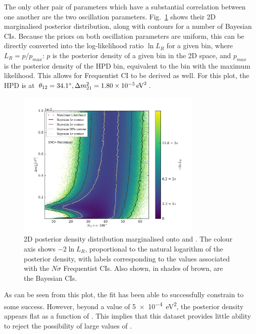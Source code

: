 The only other pair of parameters which have a substantial correlation between one another are the two oscillation parameters. Fig.~\ref{fig:2d_osc_param_posterior} shows their 2D marginalised posterior distribution, along with contours for a number of Bayesian CIs. Because the priors on both oscillation parameters are uniform, this can be directly converted into the log-likelihood ratio $\ln{L_{R}}$ for a given bin, where $L_{R} = p/p_{max}$: $p$ is the posterior density of a given bin in the 2D space, and $p_{max}$ is the posterior density of the HPD bin, equivalent to the bin with the maximum likelihood. This allows for Frequentist CI to be derived as well. For this plot, the HPD is at $\tonetwo{} = \ang{34.1}, \dmsq{} = \SI{1.80e-5}{\eV\squared}$.

\begin{figure}
    \centering
    \includegraphics[width=0.8\textwidth]{6_SolarAnalysis/images/steve_style_contours.png}
    \caption[2D posterior density distribution marginalised onto \dmsq{} and \tonetwo{}]
    {2D posterior density distribution marginalised onto \dmsq{} and \tonetwo{}. The colour axis shows $-2\ln{L_{R}}$, proportional to the natural logarithm of the posterior density, with labels corresponding to the values associated with the $N\sigma$ Frequentist CIs. Also shown, in shades of brown, are the Bayesian CIs.}
    \label{fig:2d_osc_param_posterior}
\end{figure}

As can be seen from this plot, the fit has been able to successfully constrain \tonetwo{} to some success. However, beyond a value of \SI{5e-4}{\eV\squared}, the posterior density appears flat as a function of \dmsq{}. This implies that this dataset provides little ability to reject the possibility of large values of \dmsq{}.

